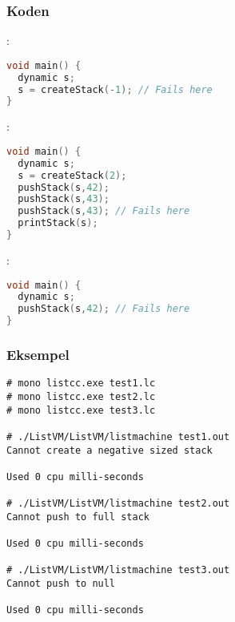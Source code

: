\subsubsection{Koden}
:
\begin{lstlisting}[language=c]
void main() {
  dynamic s;
  s = createStack(-1); // Fails here
}
\end{lstlisting}

:
\begin{lstlisting}[language=c]
void main() {
  dynamic s;
  s = createStack(2);
  pushStack(s,42);
  pushStack(s,43);
  pushStack(s,43); // Fails here
  printStack(s);
}
\end{lstlisting}

:
\begin{lstlisting}[language=c]
void main() {
  dynamic s;
  pushStack(s,42); // Fails here
}
\end{lstlisting}

\subsubsection{Eksempel}
\begin{lstlisting}
# mono listcc.exe test1.lc
# mono listcc.exe test2.lc
# mono listcc.exe test3.lc

# ./ListVM/ListVM/listmachine test1.out
Cannot create a negative sized stack

Used 0 cpu milli-seconds

# ./ListVM/ListVM/listmachine test2.out
Cannot push to full stack

Used 0 cpu milli-seconds

# ./ListVM/ListVM/listmachine test3.out
Cannot push to null

Used 0 cpu milli-seconds
\end{lstlisting}

